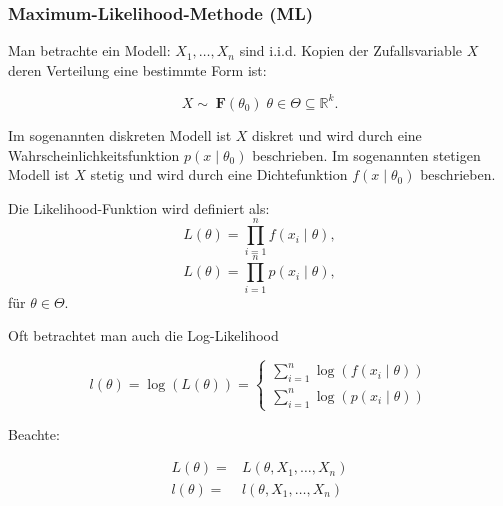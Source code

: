 \documentclass[10pt]{article}
\newcommand{\FZV}{X_1, \ldots, X_n} %
\newcommand{\IR}{\mathbb{R}} %
\newcommand{\eqname}[1]{\tag*{#1}}%
\begin{document}
	
	\subsubsection{Maximum-Likelihood-Methode (ML)}
	
	Man betrachte ein Modell: $\FZV$ sind i.i.d. Kopien der Zufallsvariable $X$ deren Verteilung eine bestimmte Form ist: 
	
	\begin{equation*}
		X \sim \; \textbf{F}(\theta_0) \;	\theta \in \Theta \subseteq \IR^k.
	\end{equation*}
	 
	\noindent Im sogenannten diskreten Modell ist $X$ diskret und wird durch eine Wahrscheinlichkeitsfunktion $p(x \mid \theta_0)$ beschrieben. 
	Im sogenannten stetigen Modell ist $X$ stetig und wird durch eine Dichtefunktion $f(x \mid \theta_0)$ beschrieben. 
	
	\begin{Definition} 
		Die Likelihood-Funktion wird definiert als:
		\begin{equation*}
			L(\theta) = \prod_{i=1}^{n} f(x_i \mid \theta), \eqname{wenn stetig}
		\end{equation*}
		\begin{equation*}
			L(\theta) = \prod_{i=1}^{n} p(x_i \mid \theta), \eqname{wenn diskret}
		\end{equation*}
		für $\theta \in \Theta$.
	\end{Definition}
	
	Oft betrachtet man auch die Log-Likelihood
	
	\begin{Definition} 
		\begin{equation*}
			l(\theta) = \log ( L(\theta)) = \begin{cases}
				\sum_{i=1}^{n} \log (f(x_i \mid \theta)) \\
				\sum_{i=1}^{n} \log (p(x_i \mid \theta)) 
			\end{cases}
		\end{equation*}
	\end{Definition}
	
	Beachte: 
	
	\begin{equation*}
		\begin{split}
			L(\theta) =& L(\theta, \FZV)\\
			l(\theta) =&l(\theta, \FZV)
		\end{split}
	\end{equation*}
	
\end{document}
